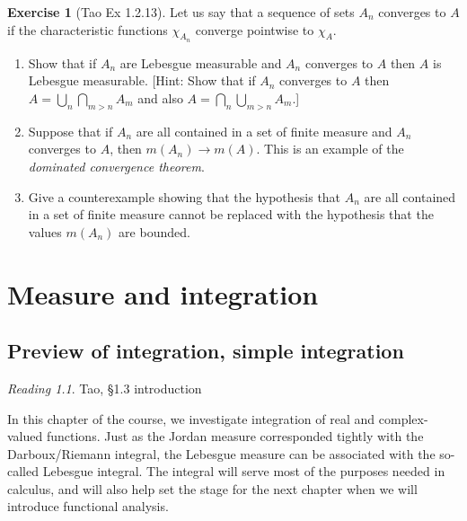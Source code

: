\documentclass[10pt,oneside]{amsbook}
\theoremstyle{definition}
\newtheorem{exerc}{Exercise}[section]
\theoremstyle{plain}
\theoremstyle{definition}
\theoremstyle{remark}
\newtheorem*{reading}{Reading}
\numberwithin{equation}{section}
\numberwithin{figure}{section}
\begin{document}
\begin{exerc}[Tao Ex 1.2.13]
  Let us say that a sequence of sets $A_n$ converges to $A$ if the characteristic functions $\chi_{A_n}$ converge pointwise to $\chi_A$.
  \begin{enumerate}
    \item Show that if $A_n$ are Lebesgue measurable and $A_n$ converges to $A$ then $A$ is Lebesgue measurable. [Hint: Show that if $A_n$ converges to $A$ then $A=\bigcup_n\bigcap_{m>n}A_m$ and also $A=\bigcap_n\bigcup_{m>n}A_m$.]
    \item Suppose that if $A_n$ are all contained in a set of finite measure and $A_n$ converges to $A$, then $m(A_n)\to m(A)$. This is an example of the \emph{dominated convergence theorem}.
    \item Give a counterexample showing that the hypothesis that $A_n$ are all contained in a set of finite measure cannot be replaced with the hypothesis that the values $m(A_n)$ are bounded.
  \end{enumerate}
\end{exerc}

\chapter{Measure and integration}

\section{Preview of integration, simple integration}


\begin{reading}
  Tao, \S 1.3 introduction
\end{reading}

In this chapter of the course, we investigate integration of real and complex-valued functions. Just as the Jordan measure corresponded tightly with the Darboux/Riemann integral, the Lebesgue measure can be associated with the so-called Lebesgue integral. The integral will serve most of the purposes needed in calculus, and will also help set the stage for the next chapter when we will introduce functional analysis.
\end{document}
